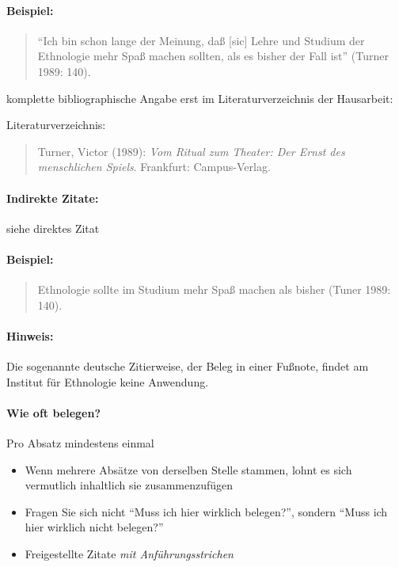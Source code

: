 \documentclass[ 12pt,
                titlepage,
                parskip=half,
                version=first,
                bibliography=totocnumbered,
                final,
                listof=totoc]{scrartcl}
\begin{document}
\paragraph{Beispiel:}
\begin{quote}
\enquote{Ich bin schon lange der Meinung, daß [sic] Lehre und Studium der
Ethnologie mehr Spaß machen sollten, als es bisher der Fall ist} (Turner 1989:
140).
\end{quote}

komplette bibliographische Angabe erst im Literaturverzeichnis der Hausarbeit:

Literaturverzeichnis:
\begin{quote}
Turner, Victor (1989): \emph{Vom Ritual zum Theater: Der Ernst des menschlichen
Spiels}. Frankfurt: Campus-Verlag.
\end{quote}

\paragraph{Indirekte Zitate:}
siehe direktes Zitat
\paragraph{Beispiel:}

\begin{quote}
Ethnologie sollte im Studium mehr Spaß machen als bisher (Tuner 1989: 140).
\end{quote}

\paragraph{Hinweis:}
Die sogenannte deutsche Zitierweise, der Beleg in einer Fußnote, findet am
Institut für Ethnologie keine Anwendung.

\paragraph{Wie oft belegen?}
Pro Absatz mindestens einmal
\begin{itemize}
\item Wenn mehrere Absätze von derselben Stelle stammen, lohnt es sich
vermutlich inhaltlich sie zusammenzufügen
\item Fragen Sie sich nicht \enquote{Muss ich hier wirklich belegen?}, sondern
\enquote{Muss ich hier wirklich nicht belegen?}
\item Freigestellte Zitate \emph{mit Anführungsstrichen}
\end{itemize}
\end{document}
